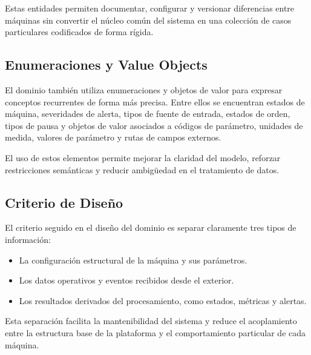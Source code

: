 Estas entidades permiten documentar, configurar y versionar diferencias entre máquinas sin convertir el núcleo común del sistema en una colección de casos particulares codificados de forma rígida.

\subsection{Enumeraciones y Value Objects}

El dominio también utiliza enumeraciones y objetos de valor para expresar conceptos recurrentes de forma más precisa. Entre ellos se encuentran estados de máquina, severidades de alerta, tipos de fuente de entrada, estados de orden, tipos de pausa y objetos de valor asociados a códigos de parámetro, unidades de medida, valores de parámetro y rutas de campos externos.

El uso de estos elementos permite mejorar la claridad del modelo, reforzar restricciones semánticas y reducir ambigüedad en el tratamiento de datos.

\subsection{Criterio de Diseño}

El criterio seguido en el diseño del dominio es separar claramente tres tipos de información:

\begin{itemize}
    \item La configuración estructural de la máquina y sus parámetros.
    \item Los datos operativos y eventos recibidos desde el exterior.
    \item Los resultados derivados del procesamiento, como estados, métricas y alertas.
\end{itemize}

Esta separación facilita la mantenibilidad del sistema y reduce el acoplamiento entre la estructura base de la plataforma y el comportamiento particular de cada máquina.